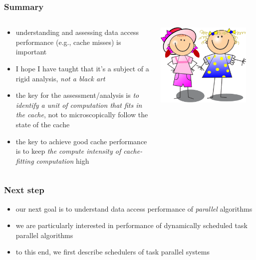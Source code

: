 \documentclass[12pt,dvipdfmx]{beamer}
\newcommand{\ao}[1]{{\color{blue}#1}}
\newcommand{\aka}[1]{{\color{red}#1}}
\begin{document}
\begin{frame}
\frametitle{Summary}
\begin{columns}
\begin{column}{0.7\textwidth}
\begin{itemize}
\item<1-> understanding and assessing data access
  performance (e.g., cache misses) is important

\item<2-> I hope I have taught that it's a subject
  of a rigid analysis, \aka{\em not a black art}

\item<3-> the key for the assessment/analysis is
  \aka{\em to identify a unit of computation that
    fits in the cache}, not to microscopically
  follow the state of the cache

\item<4-> the key to achieve good cache
  performance is to keep \aka{\em the compute
    intensity of cache-fitting computation} high
\end{itemize}
\end{column}

\begin{column}{0.3\textwidth}
\begin{center}
\includegraphics[width=0.9\textwidth]{out/pdf/svg/wakatta.pdf}    
\end{center}
\end{column}
\end{columns}
\end{frame}

\begin{frame}
\frametitle{Next step}
\begin{itemize}
\item our next goal is to understand data access 
  performance of \ao{\em parallel} algorithms

\item we are particularly interested in
  performance of dynamically scheduled task
  parallel algorithms

\item to this end, we first describe schedulers
  of task parallel systems
\end{itemize}
\end{frame}
\end{document}
